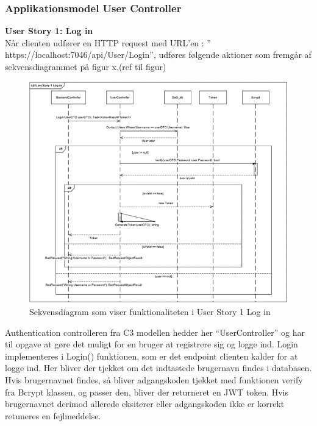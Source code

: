 \subsubsection{Applikationsmodel User Controller}
\textbf{User Story 1: Log in}\\
Når clienten udfører en HTTP request med URL’en : ” https://localhost:7046/api/User/Login”, udføres følgende aktioner som fremgår af sekvensdiagrammet på figur x.(ref til figur)\\ 

\begin{figure}[h]
\centering
\includegraphics[width = \textwidth]{02-Body/Images/Backend_sekvens_1.PNG}
\caption{Sekvensdiagram som viser funktionaliteten i User Story 1 Log in}
\label{fig:Arkitektur-Backend-Sekvens-1}
\end{figure}

Authentication controlleren fra C3 modellen hedder her “UserController” og har til opgave at gøre det muligt for en bruger at registrere sig og logge ind. Login implementeres i Login() funktionen, som er det endpoint clienten kalder for at logge ind. Her bliver der tjekket om det indtastede brugernavn findes i databasen. Hvis brugernavnet findes, så bliver adgangskoden tjekket med funktionen verify fra Bcrypt klassen, og passer den, bliver der returneret en JWT token. Hvis brugernavnet derimod allerede eksiterer eller adgangskoden ikke er korrekt retuneres en fejlmeddelse.\\


